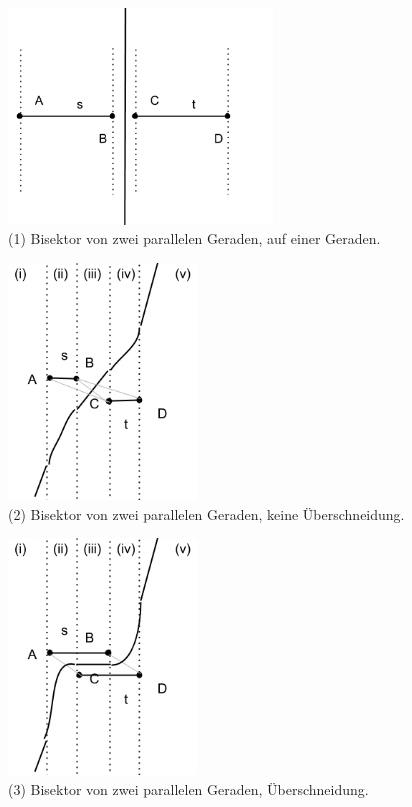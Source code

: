 \begin{figure}[h!]
\begin{center}
\includegraphics[width=7cm]{img/ssp1.png}
\end{center}
\caption{(1) Bisektor von zwei parallelen Geraden, auf einer Geraden.}
\label{fig:a1}
\end{figure}

\begin{figure}[h!]
\begin{center}
\includegraphics[width=5cm]{img/ssp2.png}
\end{center}
\caption{(2) Bisektor von zwei parallelen Geraden, keine Überschneidung.}
\label{fig:a2}
\end{figure}

\begin{figure}[h!]
\begin{center}
\includegraphics[width=5cm]{img/ss3.png}
\end{center}
\caption{(3) Bisektor von zwei parallelen Geraden, Überschneidung.}
\label{fig:a3}
\end{figure}

